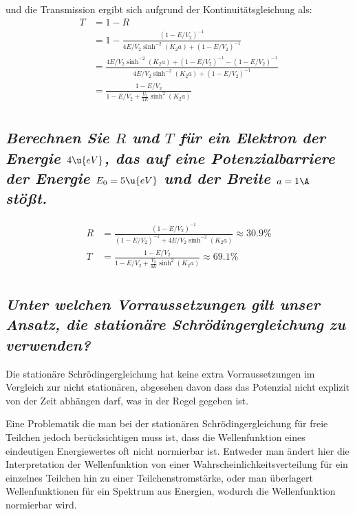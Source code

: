 \documentclass[ex,minted]{exercise_4.0}
\begin{document}
und die Transmission ergibt sich aufgrund der Kontinuitätsgleichung als: 
\begin{align*}
    T &= 1- R\\
    &= 1 -\frac{(1 - E/V_2)^{-1}}{4E/V_2\sinh^{-2}(K_2 a) + (1 - E/V_2)^{-1}}\\
    &= \frac{4E/V_2\sinh^{-2}(K_2 a) + (1 - E/V_2)^{-1} - (1 - E/V_2)^{-1}}{4E/V_2\sinh^{-2}(K_2 a) + (1 - E/V_2)^{-1}}\\
    &= \frac{1 - E/V_2}{1 - E/V_2 + \frac{V_2}{4E}\sinh^{2}(K_2 a)}\\
\end{align*}

\subsection{\it Berechnen Sie \(R\) und \(T\) für ein Elektron der Energie \(4\u{eV}\), das auf eine Potenzialbarriere der Energie \(E_0=5\u{eV}\) und der Breite \(a=1\A\) stößt.}

\dottedlinete 

\begin{align*}
    R &= \frac{(1 - E/V_2)^{-1}}{(1 - E/V_2)^{-1} + 4E/V_2\sinh^{-2}(K_2 a)}
    \approx 30.9 \% \\
   T &= \frac{1 - E/V_2}{1 - E/V_2 + \frac{V_2}{4E}\sinh^{2}(K_2 a)} \approx 69.1\%\\
\end{align*}


\subsection{\it Unter welchen Vorraussetzungen gilt unser Ansatz, die stationäre Schrödingergleichung zu verwenden?}

\dottedlinett

Die stationäre Schrödingergleichung hat keine extra Vorraussetzungen im Vergleich zur nicht stationären, abgesehen davon dass das Potenzial nicht explizit von der Zeit abhängen darf, was in der Regel gegeben ist.

Eine Problematik die man bei der stationären Schrödingergleichung für freie Teilchen jedoch berücksichtigen muss ist, dass die Wellenfunktion eines eindeutigen Energiewertes oft nicht normierbar ist. Entweder man ändert hier die Interpretation der Wellenfunktion von einer Wahrscheinlichkeitsverteilung für ein einzelnes Teilchen hin zu einer Teilchenstromstärke, oder man überlagert Wellenfunktionen für ein Spektrum aus Energien, wodurch die Wellenfunktion normierbar wird. 
\end{document}
